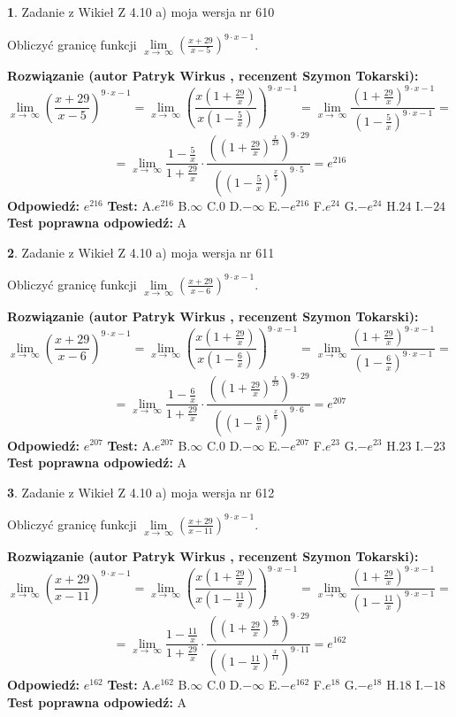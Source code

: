 \documentclass[12pt, a4paper]{article}
\theoremstyle{definition} %
\newtheorem{zad}{}
\newcommand{\zadStart}[1]{\begin{zad}#1\newline}
\newcommand{\zadStop}{\end{zad}}
\newcommand{\rozwStart}[2]{\noindent \textbf{Rozwiązanie (autor #1 , recenzent #2): }\newline}
\newcommand{\rozwStop}{\newline}
\newcommand{\odpStart}{\noindent \textbf{Odpowiedź:}\newline}
\newcommand{\odpStop}{\newline}
\newcommand{\testStart}{\noindent \textbf{Test:}\newline}
\newcommand{\testStop}{\newline}
\newcommand{\kluczStart}{\noindent \textbf{Test poprawna odpowiedź:}\newline}
\newcommand{\kluczStop}{\newline}
\begin{document}
\zadStart{Zadanie z Wikieł Z 4.10 a) moja wersja nr 610}

Obliczyć granicę funkcji  $\lim\limits_{x\to\ \infty}(\frac{x+29}{x-5})^{9\cdot x-1}$.
\zadStop
\rozwStart{Patryk Wirkus}{Szymon Tokarski}
$$\lim\limits_{x\to\ \infty}(\frac{x+29}{x-5})^{9\cdot x-1} = \lim\limits_{x\to\ \infty}(\frac{x(1+\frac{29}{x})}{x(1-\frac{5}{x})})^{9\cdot x-1}=\lim\limits_{x\to\ \infty}\frac{(1+\frac{29}{x})^{9\cdot x-1}}{(1-\frac{5}{x})^{9\cdot x-1}}=$$
$$=\lim\limits_{x\to\ \infty}\frac{1-\frac{5}{x}}{1+\frac{29}{x}}\cdot\frac{((1+\frac{29}{x})^{\frac{x}{29}})^{9\cdot29}}{((1-\frac{5}{x})^{\frac{x}{5}})^{9\cdot5}}=e^{216}$$
\rozwStop
\odpStart
$e^{216}$
\odpStop
\testStart
A.$e^{216}$ B.$\infty$ C.$0$ D.$-\infty$ E.$-e^{216}$
F.$e^{24}$ G.$-e^{24}$
H.$24$
I.$-24$
\testStop
\kluczStart
A
\kluczStop



\zadStart{Zadanie z Wikieł Z 4.10 a) moja wersja nr 611}

Obliczyć granicę funkcji  $\lim\limits_{x\to\ \infty}(\frac{x+29}{x-6})^{9\cdot x-1}$.
\zadStop
\rozwStart{Patryk Wirkus}{Szymon Tokarski}
$$\lim\limits_{x\to\ \infty}(\frac{x+29}{x-6})^{9\cdot x-1} = \lim\limits_{x\to\ \infty}(\frac{x(1+\frac{29}{x})}{x(1-\frac{6}{x})})^{9\cdot x-1}=\lim\limits_{x\to\ \infty}\frac{(1+\frac{29}{x})^{9\cdot x-1}}{(1-\frac{6}{x})^{9\cdot x-1}}=$$
$$=\lim\limits_{x\to\ \infty}\frac{1-\frac{6}{x}}{1+\frac{29}{x}}\cdot\frac{((1+\frac{29}{x})^{\frac{x}{29}})^{9\cdot29}}{((1-\frac{6}{x})^{\frac{x}{6}})^{9\cdot6}}=e^{207}$$
\rozwStop
\odpStart
$e^{207}$
\odpStop
\testStart
A.$e^{207}$ B.$\infty$ C.$0$ D.$-\infty$ E.$-e^{207}$
F.$e^{23}$ G.$-e^{23}$
H.$23$
I.$-23$
\testStop
\kluczStart
A
\kluczStop



\zadStart{Zadanie z Wikieł Z 4.10 a) moja wersja nr 612}

Obliczyć granicę funkcji  $\lim\limits_{x\to\ \infty}(\frac{x+29}{x-11})^{9\cdot x-1}$.
\zadStop
\rozwStart{Patryk Wirkus}{Szymon Tokarski}
$$\lim\limits_{x\to\ \infty}(\frac{x+29}{x-11})^{9\cdot x-1} = \lim\limits_{x\to\ \infty}(\frac{x(1+\frac{29}{x})}{x(1-\frac{11}{x})})^{9\cdot x-1}=\lim\limits_{x\to\ \infty}\frac{(1+\frac{29}{x})^{9\cdot x-1}}{(1-\frac{11}{x})^{9\cdot x-1}}=$$
$$=\lim\limits_{x\to\ \infty}\frac{1-\frac{11}{x}}{1+\frac{29}{x}}\cdot\frac{((1+\frac{29}{x})^{\frac{x}{29}})^{9\cdot29}}{((1-\frac{11}{x})^{\frac{x}{11}})^{9\cdot11}}=e^{162}$$
\rozwStop
\odpStart
$e^{162}$
\odpStop
\testStart
A.$e^{162}$ B.$\infty$ C.$0$ D.$-\infty$ E.$-e^{162}$
F.$e^{18}$ G.$-e^{18}$
H.$18$
I.$-18$
\testStop
\kluczStart
A
\kluczStop
\end{document}
